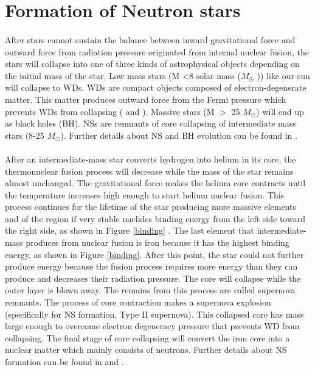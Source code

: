 \documentclass[thesis_msc.tex]{subfiles}
\begin{document}
    \section{Formation of Neutron stars} \label{formation}
    \paragraph{} After stars cannot sustain the balance between inward gravitational force and outward force from radiation pressure originated from internal nuclear fusion, the stars will collapse into one of three kinds of astrophysical objects depending on the initial mass of the star. Low mass stars (M \textless 8 solar mass ($M_\odot$ )) like our sun will collapse to WDs. WDs are compact objects composed of electron-degenerate matter. This matter produces outward force from the Fermi pressure which prevents WDs from collapsing (\cite{chandrasekhar1931maximum} and \cite{d1997evolution}). Massive stars (M $>$ 25 $M_\odot$) will end up as black holes (BH). NSs are remnants of core collapsing of intermediate mass stars (8-25 $M_\odot$). Further details about NS and BH evolution can be found in \cite{heger2003massive}. %

    \paragraph{} After an intermediate-mass star converts hydrogen into helium in its core, the thermonuclear fusion process will decrease while the mass of the star remains almost unchanged. The gravitational force makes the helium core contracts until the temperature increases high enough to start helium nuclear fusion. This process continues for the lifetime of the star producing more massive elements and of the region if very stable nuclides binding energy from the left side toward the right side, as shown in Figure \ref{binding} . The last element that intermediate-mass produces from nuclear fusion is iron because it has the highest binding energy, as shown in Figure \ref{binding}. After this point, the star could not further produce energy because the fusion process requires more energy than they can produce \citep{burbidge1957synthesis} and decreases their radiation pressure. The core will collapse while the outer layer is blown away. The remains from this process are called supernova remnants. The process of core contraction makes a supernova explosion (specifically for NS formation, Type II supernova). This collapsed core has mass large enough to overcome electron degeneracy pressure that prevents WD from collapsing. The final stage of core collapsing will convert the iron core into a nuclear matter which mainly consists of neutrons. Further details about NS formation can be found in \cite{cameron1969neutron} and \cite{portegies1998formation}. %
\end{document}
